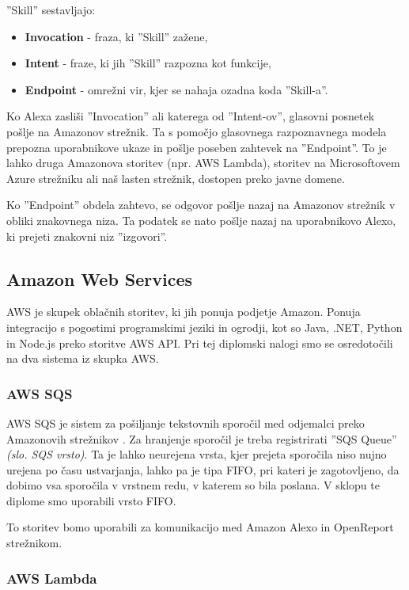 \documentclass[a4paper, 12pt]{book}
\begin{document}
\noindent ''Skill'' sestavljajo:
\begin{itemize}
	\item \textbf{Invocation} - fraza, ki ''Skill'' zažene,
	\item \textbf{Intent} - fraze, ki jih ''Skill'' razpozna kot funkcije,
	\item \textbf{Endpoint} - omrežni vir, kjer se nahaja ozadna koda ''Skill-a''.
\end{itemize}

Ko Alexa zasliši ''Invocation'' ali katerega od ''Intent-ov'', glasovni posnetek pošlje na Amazonov strežnik.
Ta s pomočjo glasovnega razpoznavnega modela prepozna uporabnikove ukaze in pošlje poseben zahtevek na ''Endpoint''.
To je lahko druga Amazonova storitev (npr. AWS Lambda), storitev na Microsoftovem Azure strežniku ali naš lasten strežnik, dostopen preko javne domene.

Ko ''Endpoint'' obdela zahtevo, se odgovor pošlje nazaj na Amazonov strežnik v obliki znakovnega niza.
Ta podatek se nato pošlje nazaj na uporabnikovo Alexo, ki prejeti znakovni niz ''izgovori''.

\subsection{Amazon Web Services}

AWS je skupek oblačnih storitev, ki jih ponuja podjetje Amazon.
Ponuja integracijo s pogostimi programskimi jeziki in ogrodji, kot so Java, .NET, Python in Node.js preko storitve AWS API.
Pri tej diplomski nalogi smo se osredotočili na dva sistema iz skupka AWS.

\subsubsection{AWS SQS}

AWS SQS je sistem za pošiljanje tekstovnih sporočil med odjemalci preko Amazonovih strežnikov \cite{sqs}.
Za hranjenje sporočil je treba registrirati ''SQS Queue'' \textit{(slo. SQS vrsto)}. 
Ta je lahko neurejena vrsta, kjer prejeta sporočila niso nujno urejena po času ustvarjanja, lahko pa je tipa FIFO, pri kateri je zagotovljeno, da dobimo vsa sporočila v vrstnem redu, v katerem so bila poslana.
V sklopu te diplome smo uporabili vrsto FIFO.

To storitev bomo uporabili za komunikacijo med Amazon Alexo in OpenReport strežnikom.

\subsubsection{AWS Lambda}
\end{document}

